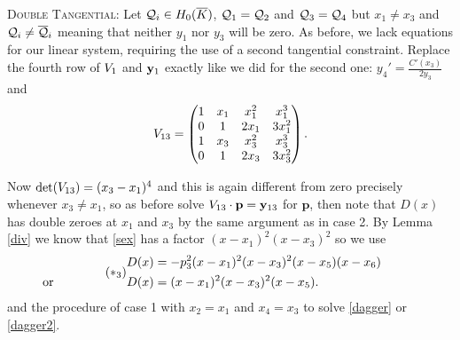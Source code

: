 \documentclass[english,11pt,a4paper]{article}
\begin{document}
\begin{case}
  {\scshape Double Tangential:} Let $\mathcal{Q}_i \in H_0(\overline K)$, $\mathcal{Q}_1 = \mathcal{Q}_2$ and $\mathcal{Q}_3 = \mathcal{Q}_4$ but $x_1 \neq x_3$ and $\mathcal{Q}_i \neq \overline {\mathcal{Q}}_i$ meaning that neither $y_1$ nor $y_3$ will be zero. As before, we lack equations for our linear system, requiring the use of a second tangential constraint. Replace the fourth row of $V_1$ and $\mathbf{y}_1$ exactly like we did for the second one: $y_4'=\frac{C'(x_3)}{2 y_3}$ and
  \begin{align*}V_{13}=
    \begin{pmatrix}
      1 & x_1 & x_1^2 & x_1^3\\
      0 & 1 & 2 x_1 & 3 x_1^2\\
      1 & x_3 & x_3^2 & x_3^3\\
      0 & 1 & 2 x_3 & 3 x_3^2\\
    \end{pmatrix}.
  \end{align*}

  Now $\det(V_{13})=(x_3-x_1)^4$ and this is again different from zero precisely whenever $x_3 \neq x_1$, so as before solve $V_{13} \cdot \mathbf{p} = \mathbf{y}_{13}$ for $\mathbf{p}$, then note that $D(x)$ has double zeroes at $x_1$ and $x_3$ by the same argument as in case 2.
  By Lemma \ref{div} we know that \eqref{sex} has a factor $(x-x_1)^2(x-x_3)^2$ so we use
  \begin{align} \tag{$*_3$} \begin{split}
    D(x) &= -p_3^2(x-x_1)^2 (x-x_3)^2 (x-x_5)(x-x_6)\\
    \rlap{\hspace{-25mm} or}
    D(x) &= (x-x_1)^2 (x-x_3)^2 (x-x_5).
  \end{split} \end{align}
  and the procedure of case 1 with $x_2 = x_1$ and $x_4 = x_3$ to solve \eqref{dagger} or \eqref{dagger2}.
\end{case}
\end{document}
